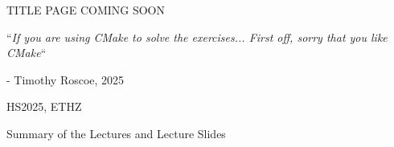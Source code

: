 \documentclass{article}
\begin{document}
\startDocument
\usetcolorboxes


\vspace{2cm}
\begin{Huge}
    \begin{center}
        TITLE PAGE COMING SOON
    \end{center}
\end{Huge}


\vspace{4cm}
\begin{center}
    \begin{Large}
        ``\textit{If you are using CMake to solve the exercises... First off, sorry that you like CMake}``
    \end{Large}

    \hspace{3cm} - Timothy Roscoe, 2025
\end{center}

\vspace{3cm}
\begin{center}
    HS2025, ETHZ\\[0.2cm]
    \begin{Large}
        Summary of the Lectures and Lecture Slides
    \end{Large}\\[0.2cm]
\end{center}





\newpage
{}



\end{document}
